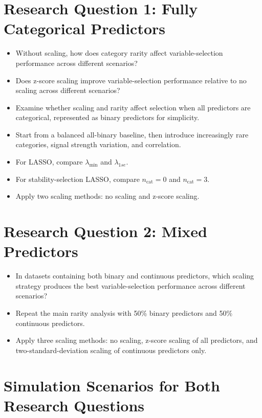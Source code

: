 \documentclass[12pt,a4paper,twoside]{report}
\begin{document}
\section{Research Question 1: Fully Categorical Predictors}

\begin{itemize}
  \item Without scaling, how does category rarity affect variable-selection performance across different scenarios?
  \item Does z-score scaling improve variable-selection performance relative to no scaling across different scenarios?
  \item Examine whether scaling and rarity affect selection when all predictors are categorical, represented as binary predictors for simplicity.
  \item Start from a balanced all-binary baseline, then introduce increasingly rare categories, signal strength variation, and correlation.
  \item For LASSO, compare $\lambda_{\min}$ and $\lambda_{1se}$.
  \item For stability-selection LASSO, compare $n_{\mathrm{cat}} = 0$ and $n_{\mathrm{cat}} = 3$.
  \item Apply two scaling methods: no scaling and z-score scaling.
\end{itemize}

\section{Research Question 2: Mixed Predictors}

\begin{itemize}
  \item In datasets containing both binary and continuous predictors, which scaling strategy produces the best variable-selection performance across different scenarios?
  \item Repeat the main rarity analysis with 50\% binary predictors and 50\% continuous predictors.
  \item Apply three scaling methods: no scaling, z-score scaling of all predictors, and two-standard-deviation scaling of continuous predictors only.
\end{itemize}

\section{Simulation Scenarios for Both Research Questions}
\end{document}
